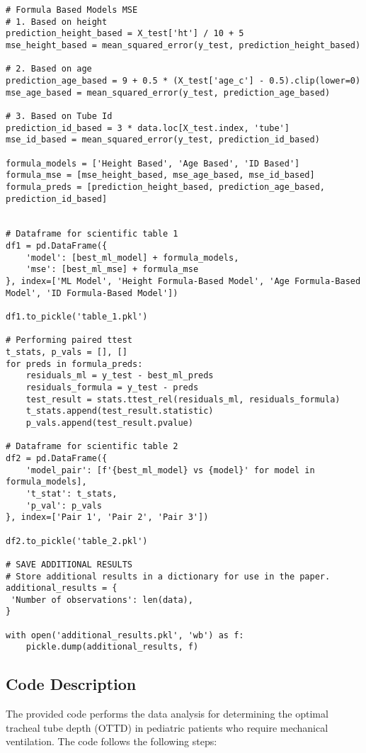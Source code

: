 \documentclass[11pt]{article}
\begin{document}
\begin{verbatim}
# Formula Based Models MSE
# 1. Based on height
prediction_height_based = X_test['ht'] / 10 + 5
mse_height_based = mean_squared_error(y_test, prediction_height_based)

# 2. Based on age
prediction_age_based = 9 + 0.5 * (X_test['age_c'] - 0.5).clip(lower=0)
mse_age_based = mean_squared_error(y_test, prediction_age_based)

# 3. Based on Tube Id
prediction_id_based = 3 * data.loc[X_test.index, 'tube']
mse_id_based = mean_squared_error(y_test, prediction_id_based)

formula_models = ['Height Based', 'Age Based', 'ID Based']
formula_mse = [mse_height_based, mse_age_based, mse_id_based]
formula_preds = [prediction_height_based, prediction_age_based, prediction_id_based]


# Dataframe for scientific table 1
df1 = pd.DataFrame({
    'model': [best_ml_model] + formula_models,
    'mse': [best_ml_mse] + formula_mse
}, index=['ML Model', 'Height Formula-Based Model', 'Age Formula-Based Model', 'ID Formula-Based Model'])

df1.to_pickle('table_1.pkl')

# Performing paired ttest
t_stats, p_vals = [], []
for preds in formula_preds:
    residuals_ml = y_test - best_ml_preds
    residuals_formula = y_test - preds
    test_result = stats.ttest_rel(residuals_ml, residuals_formula)
    t_stats.append(test_result.statistic)
    p_vals.append(test_result.pvalue)

# Dataframe for scientific table 2
df2 = pd.DataFrame({
    'model_pair': [f'{best_ml_model} vs {model}' for model in formula_models],
    't_stat': t_stats,
    'p_val': p_vals
}, index=['Pair 1', 'Pair 2', 'Pair 3'])

df2.to_pickle('table_2.pkl')

# SAVE ADDITIONAL RESULTS
# Store additional results in a dictionary for use in the paper.
additional_results = {
 'Number of observations': len(data),
}

with open('additional_results.pkl', 'wb') as f:
    pickle.dump(additional_results, f)

\end{verbatim}

\subsection{Code Description}

The provided code performs the data analysis for determining the optimal tracheal tube depth (OTTD) in pediatric patients who require mechanical ventilation. The code follows the following steps:
\end{document}
